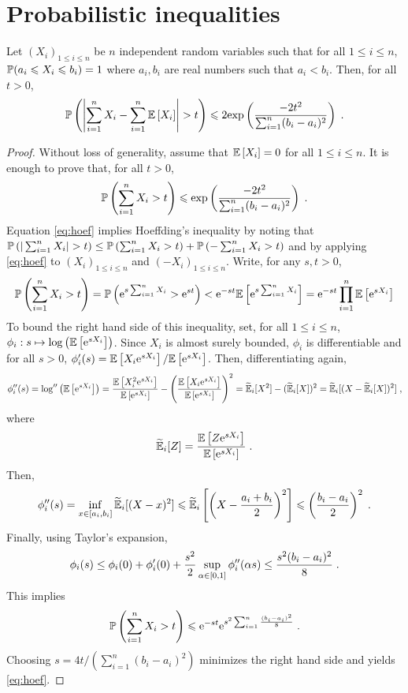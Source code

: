 \section{Probabilistic inequalities}
\begin{shaded}
\begin{theorem}
\label{th:hoeffding}
Let $(X_i)_{1\leqslant i\leqslant n}$ be $n$ independent random variables such that for all $1\leqslant i\leqslant n$, $\mathbb{P}(a_i\leqslant X_i\leqslant b_i) = 1$ where $a_i, b_i$ are real numbers such that $a_i<b_i$. Then, for all $t>0$,
\[
\bP\left(\left|\sum_{i=1}^n X_i - \sum_{i=1}^n \bE\left[X_i\right]\right|>t\right)\leqslant 2\mathrm{exp}\left(\frac{-2t^2}{\sum_{i=1}^n(b_i-a_i)^2}\right)\eqsp.
\]
\end{theorem}
\end{shaded}
\begin{proof}
Without loss of generality, assume that $\PE[X_i]=0$ for all $1\leqslant i\leqslant n$. It is enough to prove that, for all $t>0$,
\begin{equation}
\label{eq:hoef}
\mathbb{P}\left( \sum_{i=1}^n X_i>t \right)\leqslant \mathrm{exp}\left(\frac{-2t^2}{\sum_{i=1}^n(b_i-a_i)^2}\right)\;.
\end{equation}
Equation \eqref{eq:hoef} implies Hoeffding's inequality by noting that $\bP\lr{|\sum_{i=1}^n X_i|>t}\leq \bP\lr{\sum_{i=1}^n X_i>t}+\bP\lr{-\sum_{i=1}^n X_i>t}$ and by applying \eqref{eq:hoef} to $(X_i)_{1\leqslant i\leqslant n}$ and $(-X_i)_{1\leqslant i\leqslant n}$.
 Write, for any $s,t>0$,
\begin{align*}
\PP\lr{\sum_{i=1}^n X_i>t}=\PP\lr{\rme^{s \sum_{i=1}^n X_i}>\rme^{st}} < \rme^{-st}\PE\lrb{\rme^{s \sum_{i=1}^n X_i}}=\rme^{-st}\prod_{i=1}^{n}\PE\lrb{\rme^{s X_i}}
\end{align*}
To bound the right hand side of this inequality, set, for all $1\leqslant i\leqslant n$, $\phi_i: s\mapsto \log\lr{\PE\lrb{\rme^{s X_i}}}$. Since $X_i$ is almost surely bounded,  $\phi_i$ is differentiable  and for all $s>0$, $\phi_i'(s)=\PE\lrb{X_i \rme^{s X_i}}/\PE\lrb{\rme^{s X_i}}$. Then, differentiating again,
\begin{align*}
\phi_i''(s)=\log''\lr{\PE\lrb{\rme^{s X_i}}}=\frac{\PE\lrb{X_i^2 \rme^{s X_i}}}{\PE\lrb{\rme^{s X_i}}} - \lr{\frac{\PE\lrb{X_i \rme^{s X_i}}}{\PE\lrb{\rme^{s X_i}}}}^2=\widetilde \PE_i[X^2]-(\widetilde \PE_i[X])^2 =\widetilde \PE_i[(X-\widetilde \PE_i[X])^2]\eqsp,
\end{align*}
where
\[
\widetilde \PE_i[Z]=\frac{\PE\lrb{Z \rme^{s X_i}}}{\PE\lrb{\rme^{s X_i}}}\eqsp.
\]
Then,
\[
\phi_i''(s) = \inf_{x \in [a_i,b_i]}\widetilde \PE_i[(X-x)^2] \leqslant \widetilde \PE_i\lrb{\lr{X-\frac{a_i+b_i}{2}}^2} \leqslant \lr{\frac{b_i-a_i}{2}}^2\eqsp.
\]
Finally, using Taylor's expansion,
\begin{equation}
\label{eq:hoeffding:loglaplace}
\phi_i(s)\leq \phi_i(0)+\phi_i'(0)+\frac{s^2}{2} \sup_{\alpha \in [0,1]} \phi_i''(\alpha s) \leq \frac{s^2(b_i-a_i)^2}{8}\;.
\end{equation}
This implies
$$
\PP\lr{\sum_{i=1}^n X_i>t} \leqslant \rme^{-st} \rme^{s^2 \sum_{i=1}^n  \frac{(b_i-a_i)^2}{8}} \eqsp.
$$
Choosing $s=4t/(\sum_{i=1}^n (b_i-a_i)^2)$ minimizes the right hand side and yields \eqref{eq:hoef}.



\end{proof}
